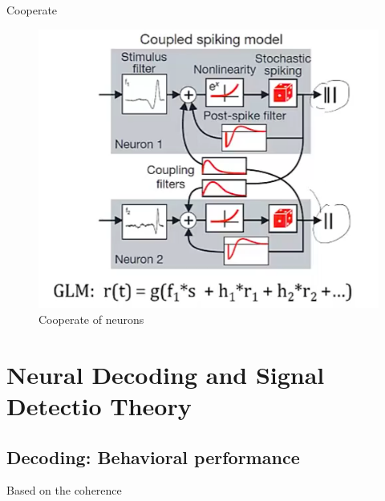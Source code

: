 \documentclass{book}
\begin{document}
Cooperate

\begin{figure}[h]
\centering
\includegraphics[width=0.7\linewidth]{figures/twoneuron}
\caption{Cooperate of neurons}
\label{fig:twoneuron}
\end{figure}

\chapter{Neural Decoding and Signal Detectio Theory}

\section{Decoding: Behavioral performance}

Based on the coherence



 
\end{document}
